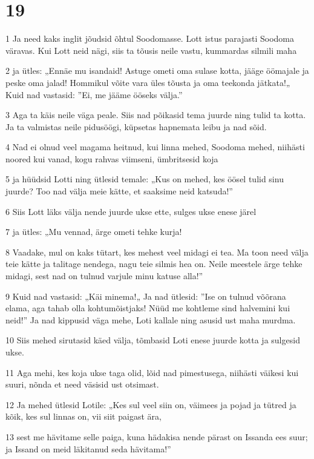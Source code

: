 \chapter{19}

\par 1 Ja need kaks inglit jõudsid õhtul Soodomasse. Lott istus parajasti Soodoma väravas. Kui Lott neid nägi, siis ta tõusis neile vastu, kummardas silmili maha
\par 2 ja ütles: „Ennäe mu isandaid! Astuge ometi oma sulase kotta, jääge öömajale ja peske oma jalad! Hommikul võite vara üles tõusta ja oma teekonda jätkata!„ Kuid nad vastasid: ”Ei, me jääme ööseks välja.”
\par 3 Aga ta käis neile väga peale. Siis nad põikasid tema juurde ning tulid ta kotta. Ja ta valmistas neile pidusöögi, küpsetas hapnemata leibu ja nad sõid.
\par 4 Nad ei olnud veel magama heitnud, kui linna mehed, Soodoma mehed, niihästi noored kui vanad, kogu rahvas viimseni, ümbritsesid koja
\par 5 ja hüüdsid Lotti ning ütlesid temale: „Kus on mehed, kes öösel tulid sinu juurde? Too nad välja meie kätte, et saaksime neid katsuda!”
\par 6 Siis Lott läks välja nende juurde ukse ette, sulges ukse enese järel
\par 7 ja ütles: „Mu vennad, ärge ometi tehke kurja!
\par 8 Vaadake, mul on kaks tütart, kes mehest veel midagi ei tea. Ma toon need välja teie kätte ja talitage nendega, nagu teie silmis hea on. Neile meestele ärge tehke midagi, sest nad on tulnud varjule minu katuse alla!”
\par 9 Kuid nad vastasid: „Käi minema!„ Ja nad ütlesid: ”Ise on tulnud võõrana elama, aga tahab olla kohtumõistjaks! Nüüd me kohtleme sind halvemini kui neid!” Ja nad kippusid väga mehe, Loti kallale ning asusid ust maha murdma.
\par 10 Siis mehed sirutasid käed välja, tõmbasid Loti enese juurde kotta ja sulgesid ukse.
\par 11 Aga mehi, kes koja ukse taga olid, lõid nad pimestusega, niihästi väikesi kui suuri, nõnda et need väsisid ust otsimast.
\par 12 Ja mehed ütlesid Lotile: „Kes sul veel siin on, väimees ja pojad ja tütred ja kõik, kes sul linnas on, vii siit paigast ära,
\par 13 sest me hävitame selle paiga, kuna hädakisa nende pärast on Issanda ees suur; ja Issand on meid läkitanud seda hävitama!”
